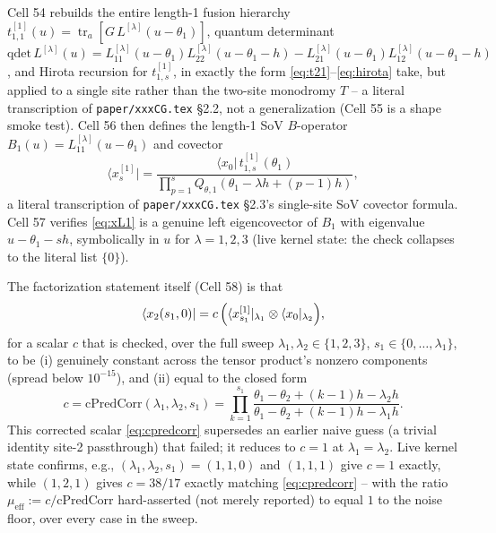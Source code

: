 \documentclass[11pt]{article}
\newcommand{\qthone}{Q_{\theta,1}}
\begin{document}
Cell 54 rebuilds the entire length-1 fusion hierarchy $t_{1,1}^{[1]}(u)=\operatorname{tr}_a[G\,
L^{[\lambda]}(u-\theta_1)]$, quantum determinant $\mathrm{qdet}\,L^{[\lambda]}(u) =
L^{[\lambda]}_{11}(u-\theta_1)L^{[\lambda]}_{22}(u-\theta_1-h) -
L^{[\lambda]}_{21}(u-\theta_1)L^{[\lambda]}_{12}(u-\theta_1-h)$, and Hirota recursion for
$t_{1,s}^{[1]}$, in exactly the form \eqref{eq:t21}--\eqref{eq:hirota} take, but applied to a single
site rather than the two-site monodromy $T$ -- a literal transcription of
\texttt{paper/xxxCG.tex} \S2.2, not a generalization (Cell 55 is a shape smoke test). Cell 56 then
defines the length-1 SoV $B$-operator $B_1(u)=L^{[\lambda]}_{11}(u-\theta_1)$ and covector
\begin{equation}
  \langle x^{[1]}_s| = \frac{\langle x_0|\,t_{1,s}^{[1]}(\theta_1)}{\prod_{p=1}^{s}\qthone(\theta_1-\lambda h+(p-1)h)},
  \label{eq:xL1}
\end{equation}
a literal transcription of \texttt{paper/xxxCG.tex} \S2.3's single-site SoV covector formula. Cell
57 verifies \eqref{eq:xL1} is a genuine left eigencovector of $B_1$ with eigenvalue $u-\theta_1-sh$,
symbolically in $u$ for $\lambda=1,2,3$ (live kernel state: the check collapses to the literal list
$\{0\}$).

The factorization statement itself (Cell 58) is that
\begin{equation}
  \langle x_2(s_1,0)| = c\,\Bigl(\langle x^{[1]}_{s_1}|_{\lambda_1}\otimes \langle x_0|_{\lambda_2}\Bigr),
  \label{eq:factorization}
\end{equation}
for a scalar $c$ that is checked, over the full sweep $\lambda_1,\lambda_2\in\{1,2,3\}$,
$s_1\in\{0,\dots,\lambda_1\}$, to be (i) genuinely constant across the tensor product's nonzero
components (spread below $10^{-15}$), and (ii) equal to the closed form
\begin{equation}
  c = \mathrm{cPredCorr}(\lambda_1,\lambda_2,s_1) = \prod_{k=1}^{s_1}
    \frac{\theta_1-\theta_2+(k-1)h-\lambda_2 h}{\theta_1-\theta_2+(k-1)h-\lambda_1 h}.
  \label{eq:cpredcorr}
\end{equation}
This corrected scalar \eqref{eq:cpredcorr} supersedes an earlier naive guess (a trivial identity
site-2 passthrough) that failed; it reduces to $c=1$ at $\lambda_1=\lambda_2$. Live kernel state
confirms, e.g., $(\lambda_1,\lambda_2,s_1)=(1,1,0)$ and $(1,1,1)$ give $c=1$ exactly, while
$(1,2,1)$ gives $c=38/17$ exactly matching \eqref{eq:cpredcorr} -- with the ratio $\mu_{\mathrm{eff}}
:= c/\mathrm{cPredCorr}$ hard-asserted (not merely reported) to equal $1$ to the noise floor, over
every case in the sweep.
\end{document}
